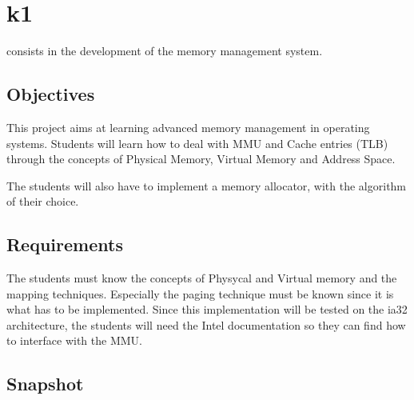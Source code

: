 %
%
%
%
%
%

%
%

\chapter{k1}
\label{chapter:k1}

 consists in the development of the memory management system.

\newpage

%
%

%
%

\section{Objectives}

This project aims at learning advanced memory management in operating systems. Students will learn how to deal with MMU and Cache entries (TLB) through the concepts of Physical Memory, Virtual Memory and Address Space.

The students will also have to implement a memory allocator, with the algorithm of their choice.

%
%

\section{Requirements}

The students must know the concepts of Physycal and Virtual memory and the mapping techniques. Especially the paging technique must be known since it is what has to be implemented. Since this implementation will be tested on the ia32 architecture, the students will need the Intel documentation so they can find how to interface with the MMU.

%
%

\section{Snapshot}

